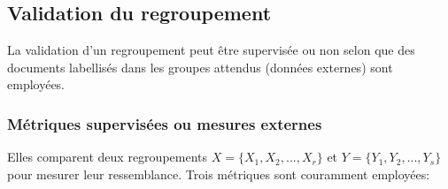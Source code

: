 


\subsection{Validation du regroupement}
La validation d'un regroupement peut être supervisée ou non selon que des documents labellisés dans les groupes attendus (données externes) sont employées.

\subsubsection{Métriques supervisées ou mesures externes}
\label{sec:similarite:biblio:supeval}
Elles comparent deux regroupements $X = \lbrace X_1, X_2, ..., X_r \rbrace$ et $Y = \lbrace Y_1, Y_2, ..., Y_s \rbrace$ pour mesurer leur ressemblance. Trois métriques sont couramment employées:
